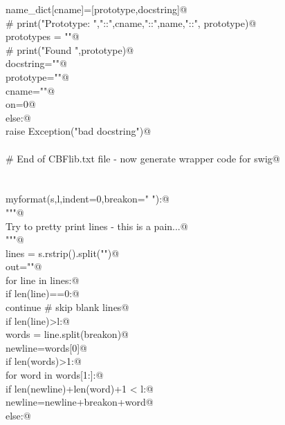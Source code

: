 \documentclass[10pt,a4paper,twoside,notitlepage]{article}
\begin{document}
\begin{flushleft}
\begin{minipage}{\linewidth}
\begin{list}{}{}
\mbox{}\verb@                name_dict[cname]=[prototype,docstring]@\\
\mbox{}\verb@                # print("Prototype: ","::",cname,"::",name,"::", prototype)@\\
\mbox{}\verb@            prototypes = ""@\\
\mbox{}\verb@            # print("Found ",prototype)@\\
\mbox{}\verb@            docstring="\n"@\\
\mbox{}\verb@            prototype=""@\\
\mbox{}\verb@            cname=""@\\
\mbox{}\verb@            on=0@\\
\mbox{}\verb@         else:@\\
\mbox{}\verb@            raise Exception("bad docstring")@\\
\mbox{}\verb@@\\
\mbox{}\verb@# End of CBFlib.txt file - now generate wrapper code for swig@\\
\mbox{}\verb@@\\
\mbox{}\verb@@\\
\mbox{}\verb@def myformat(s,l,indent=0,breakon=" "):@\\
\mbox{}\verb@   """@\\
\mbox{}\verb@   Try to pretty print lines - this is a pain...@\\
\mbox{}\verb@   """@\\
\mbox{}\verb@   lines = s.rstrip().split("\n")@\\
\mbox{}\verb@   out=""@\\
\mbox{}\verb@   for line in lines:@\\
\mbox{}\verb@      if len(line)==0:@\\
\mbox{}\verb@         continue # skip blank lines@\\
\mbox{}\verb@      if len(line)>l:@\\
\mbox{}\verb@         words = line.split(breakon)@\\
\mbox{}\verb@         newline=words[0]@\\
\mbox{}\verb@         if len(words)>1:@\\
\mbox{}\verb@            for word in words[1:]:@\\
\mbox{}\verb@               if len(newline)+len(word)+1 < l:@\\
\mbox{}\verb@                  newline=newline+breakon+word@\\
\mbox{}\verb@               else:@\\

\end{list}
\end{minipage}
\end{flushleft}
\end{document}
